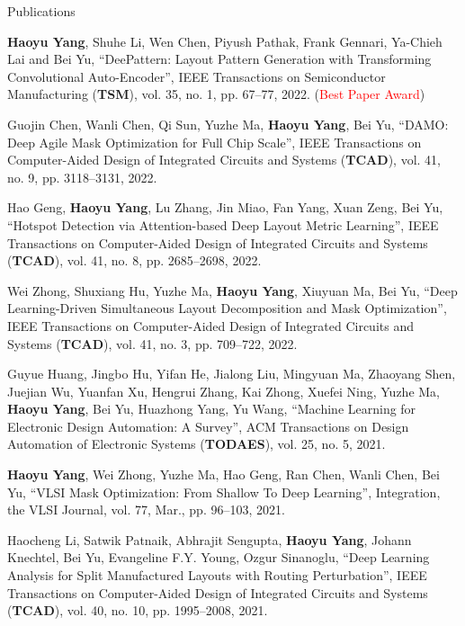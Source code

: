 \begin{rSection}{Publications}
\begin{description}[font=\normalfont]
\item[{[J15]}]{
	\textbf{Haoyu Yang}, Shuhe Li, Wen Chen, Piyush Pathak, Frank Gennari, Ya-Chieh Lai and Bei Yu, ``DeePattern: Layout Pattern Generation with Transforming Convolutional Auto-Encoder'',
	IEEE Transactions on Semiconductor Manufacturing (\textbf{TSM}), vol. 35, no. 1, pp. 67–77, 2022. (\textcolor{red}{Best Paper Award})
}

\item[{[J14]}]{
	Guojin Chen, Wanli Chen, Qi Sun, Yuzhe Ma, \textbf{Haoyu Yang}, Bei Yu,
	``DAMO: Deep Agile Mask Optimization for Full Chip Scale'', 
	IEEE Transactions on Computer-Aided Design of Integrated Circuits and Systems (\textbf{TCAD}), vol. 41, no. 9, pp. 3118–3131, 2022.
}

\item[{[J13]}]{
	Hao Geng, \textbf{Haoyu Yang}, Lu Zhang, Jin Miao, Fan Yang, Xuan Zeng, Bei Yu,
	``Hotspot Detection via Attention-based Deep Layout Metric Learning'', 
	IEEE Transactions on Computer-Aided Design of Integrated Circuits and Systems (\textbf{TCAD}), vol. 41, no. 8, pp. 2685–2698, 2022.
}
	
\item[{[J12]}]{
	Wei Zhong, Shuxiang Hu, Yuzhe Ma, \textbf{Haoyu Yang}, Xiuyuan Ma, Bei Yu,
	``Deep Learning-Driven Simultaneous Layout Decomposition and Mask Optimization'', 
	IEEE Transactions on Computer-Aided Design of Integrated Circuits and Systems (\textbf{TCAD}), vol. 41, no. 3, pp. 709–722, 2022.
}


\item[{[J11]}]{
	Guyue Huang, Jingbo Hu, Yifan He, Jialong Liu, Mingyuan Ma, Zhaoyang Shen, Juejian Wu, Yuanfan Xu, Hengrui Zhang, Kai Zhong, Xuefei Ning, Yuzhe Ma, \textbf{Haoyu Yang}, Bei Yu, Huazhong Yang, Yu Wang,
	``Machine Learning for Electronic Design Automation: A Survey'', 
	ACM Transactions on Design Automation of Electronic Systems (\textbf{TODAES}), vol. 25, no. 5, 2021.
}
	
\item[{[J10]}]{
	\textbf{Haoyu Yang}, Wei Zhong, Yuzhe Ma, Hao Geng, Ran Chen, Wanli Chen, Bei Yu,
	``VLSI Mask Optimization: From Shallow To Deep Learning'', 
	Integration, the VLSI Journal, vol. 77, Mar., pp. 96–103, 2021.
}

\item[{[J9]}]{
	Haocheng Li, Satwik Patnaik, Abhrajit Sengupta, \textbf{Haoyu Yang}, Johann Knechtel, Bei Yu, Evangeline F.Y. Young, Ozgur Sinanoglu, 
	``Deep Learning Analysis for Split Manufactured Layouts with Routing Perturbation'',  
	IEEE Transactions on Computer-Aided Design of Integrated Circuits and Systems (\textbf{TCAD}), vol. 40, no. 10, pp. 1995–2008, 2021.
}
	

\end{description}
\end{rSection}

